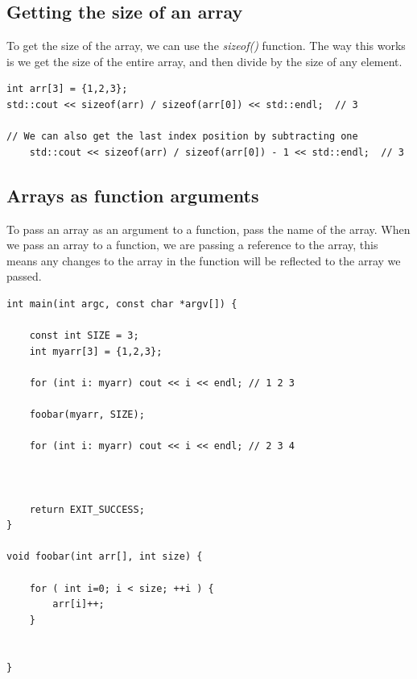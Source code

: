 \documentclass{report}
\begin{document}
   \pagebreak \bigbreak \noindent 
   \subsection{Getting the size of an array}
   \bigbreak \noindent 
   To get the size of the array, we can use the \textit{sizeof()} function. The way this works is we get the size of the entire array, and then divide by the size of any element.
   \bigbreak \noindent 
    \sepline
    \begin{verbatim}
int arr[3] = {1,2,3};
std::cout << sizeof(arr) / sizeof(arr[0]) << std::endl;  // 3

// We can also get the last index position by subtracting one
    std::cout << sizeof(arr) / sizeof(arr[0]) - 1 << std::endl;  // 3
    \end{verbatim}
    \sepline
    \bigbreak \noindent 

    \bigbreak \noindent 
    \subsection{Arrays as function arguments}
    \bigbreak \noindent 
    \begin{concept}
  To pass an array as an argument to a function, pass the name of the array. When we pass an array to a function, we are passing a reference to the array, this means any changes to the array in the function will be reflected to the array we passed.
	\end{concept}
    \bigbreak \noindent 
    \sepline
    \begin{verbatim}
int main(int argc, const char *argv[]) {

    const int SIZE = 3;
    int myarr[3] = {1,2,3};

    for (int i: myarr) cout << i << endl; // 1 2 3

    foobar(myarr, SIZE);

    for (int i: myarr) cout << i << endl; // 2 3 4



    return EXIT_SUCCESS;
}

void foobar(int arr[], int size) {

    for ( int i=0; i < size; ++i ) {
        arr[i]++;
    }


}
    \end{verbatim}
    \sepline

    \bigbreak \noindent 
\end{document}
